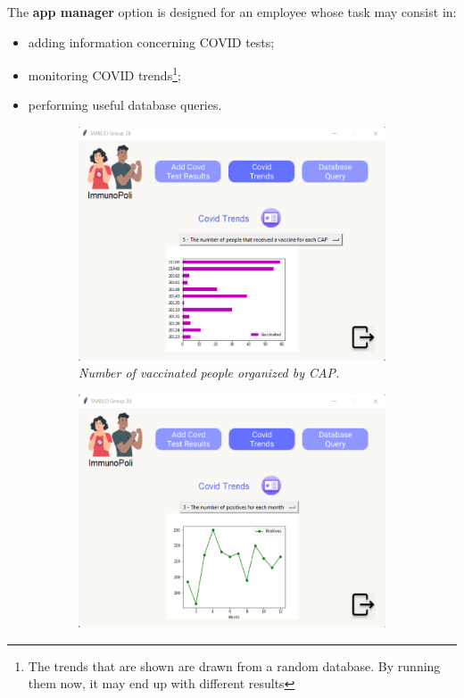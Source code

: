 \newpage
\noindent
The \textbf{app manager} option is designed for an employee whose task may consist in:
\begin{itemize}
    \item adding information concerning COVID tests;
    \item monitoring COVID trends\footnote{The trends that are shown are drawn from a random database. By running them now, it may end up with different results};
    \item performing useful database queries.
\end{itemize}
\begin{figure}[h]
    \begin{subfigure}{.5\textwidth}
        \centering
        \includegraphics[width=\linewidth]{images/application_screenshots/vaccinated_per_CAP.png}  
  \caption{\textit{Number of vaccinated people organized by CAP.}}
  \label{fig: mean_age}
\end{subfigure}
\begin{subfigure}{.5\textwidth}
  \centering
  \includegraphics[width=\linewidth]{images/application_screenshots/positive per month.png}  

\end{subfigure}
\end{figure}
